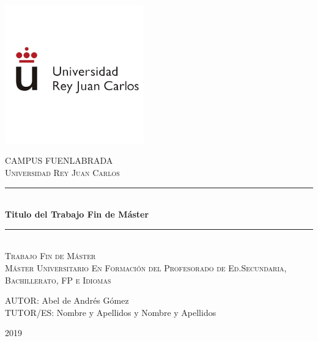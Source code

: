 \documentclass[spanish,12pt, a4paper,twoside]{paper}
\begin{document}
\begin{titlepage}

\newcommand{\HRule}{\rule{\linewidth}{0.5mm}} %

\renewcommand{\baselinestretch}{1.5}


  \hspace{9cm}
\includegraphics[width=6cm]{recursos/Logo_URJC.png}
\\[0cm]

\center %

\textsc{\Large CAMPUS FUENLABRADA}\\[0.5cm]
\textsc{\large Universidad Rey Juan Carlos }
\\[3cm]



 \HRule \\[0.4cm]
{ \huge \bfseries Titulo del Trabajo Fin de Máster}\\[0.4cm] %
\HRule \\[2 cm]

\textsc{\LARGE Trabajo Fin de Máster}\\[0.5cm] 
\textsc{\Large Máster Universitario En Formación del Profesorado de Ed.Secundaria, Bachillerato, FP e Idiomas }\\[2 cm]

\begin{flushright}
\large
AUTOR: Abel de Andrés Gómez\\
TUTOR/ES: Nombre y Apellidos y \linebreak
                    Nombre y Apellidos
\end{flushright}

\vspace{1.3cm}

{ {2019}}\\[3cm]

\vfill %

\end{titlepage}
\end{document}
